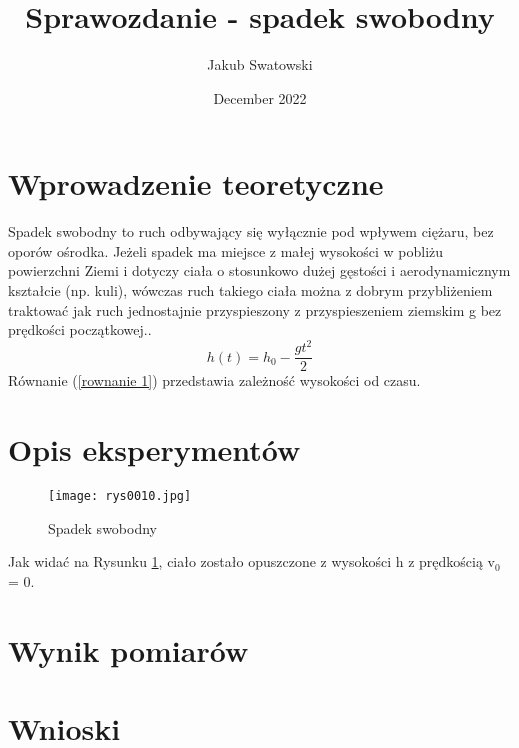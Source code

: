 \documentclass{article}
\title{Sprawozdanie - spadek swobodny}
\author{Jakub Swatowski}
\date{December 2022}
\begin{document}
\maketitle

\section{Wprowadzenie teoretyczne}
Spadek swobodny to ruch odbywający się wyłącznie pod wpływem ciężaru, bez oporów ośrodka. Jeżeli spadek ma miejsce z małej wysokości w pobliżu powierzchni Ziemi i dotyczy ciała o stosunkowo dużej gęstości i aerodynamicznym kształcie (np. kuli), wówczas ruch takiego ciała można z dobrym przybliżeniem traktować jak ruch jednostajnie przyspieszony z przyspieszeniem ziemskim g bez prędkości początkowej..
\begin{equation}
   h(t) = h_0 - \frac{gt^2}{2}
   \label{rownanie 1}
\end{equation}
Równanie (\ref{rownanie 1}) przedstawia zależność wysokości od czasu.

\section{Opis eksperymentów}
\begin{figure}[htb]
    \texttt{[image: rys0010.jpg]}
    \centering
    \caption{Spadek swobodny}
    \label{rysunek 1}
\end{figure}
\begin{flushleft}
Jak widać na Rysunku \ref{rysunek 1}, ciało zostało opuszczone z wysokości h z prędkością v$_0$ = 0.
\end{flushleft}

\section{Wynik pomiarów}

\section{Wnioski}
\end{document}
